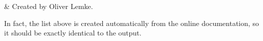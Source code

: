 \label{app:methods}


 & Created by Oliver Lemke. \\
\stophistory



\noindent
In fact, the list above is created automatically from the online
documentation, so it should be exactly identical to the
 output. 



